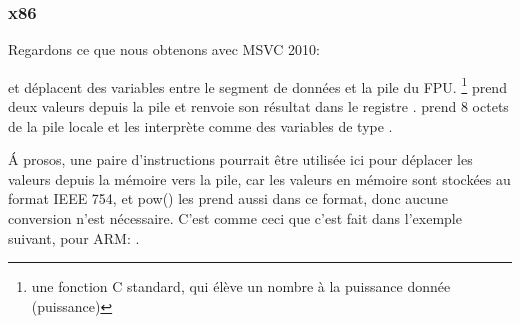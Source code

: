 \subsubsection{x86}

Regardons ce que nous obtenons avec MSVC 2010:




\FLD et \FSTP déplacent des variables entre le segment de données et la pile du FPU.
\footnote{une fonction C standard, qui élève un nombre à la puissance
donnée (puissance)} prend deux valeurs depuis la pile et renvoie son résultat dans
le registre .
\printf prend 8 octets de la pile locale et les interprète comme des variables de
type \Tdouble.

Á prosos, une paire d'instructions \MOV pourrait être utilisée ici pour déplacer
les valeurs depuis la mémoire vers la pile, car les valeurs en mémoire sont stockées
au format IEEE 754, et pow() les prend aussi dans ce format, donc aucune conversion
n'est nécessaire.
C'est comme ceci que c'est fait dans l'exemple suivant, pour ARM: .

